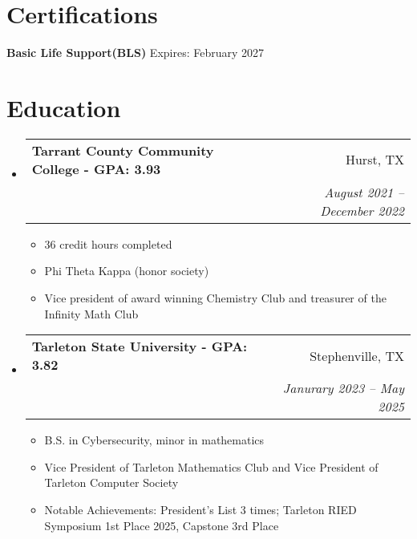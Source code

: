 \documentclass[letterpaper,11pt]{article}
\makeatletter
\newcommand{\resumeItem}[1]{
  \item\small{
    {#1 \vspace{-2pt}}
  }
}
\newcommand{\resumeSubheading}[4]{
  \item
  \begin{tabular*}{0.97\textwidth}[t]{l@{\extracolsep{\fill}}r}
    \textbf{#1} & #2 \\
    \textit{\small#3} & \textit{\small #4} \\
  \end{tabular*}
}
\newcommand{\resumeSubHeadingListStart}{
  \begin{itemize}[leftmargin=0.15in, label={}, topsep=-3pt, itemsep=-3pt]
}
\newcommand{\resumeSubHeadingListEnd}{
  \end{itemize}
}
\newcommand{\resumeItemListStart}{\begin{itemize}}
\newcommand{\resumeItemListEnd}{\end{itemize}\vspace{-5pt}}
\makeatother
\begin{document}
\section{Certifications}
 \begin{itemize}[leftmargin=0.15in, label={}]
    \small{\item{
     \textbf{Basic Life Support(BLS)}{  Expires: February 2027} \\
    }}
 \end{itemize}


\section{Education}
\resumeSubHeadingListStart
    \resumeSubheading
      {Tarrant County Community College \textnormal{- GPA: 3.93}}{Hurst, TX}
      {}{August 2021 -- December 2022}
      \resumeItemListStart
        \resumeItem{36 credit hours completed}
        \resumeItem{Phi Theta Kappa (honor society)}
        \resumeItem{Vice president of award winning Chemistry Club and treasurer of the Infinity Math Club}
      \resumeItemListEnd
  \resumeSubHeadingListEnd
  \resumeSubHeadingListStart
    \vspace{1.0em}
    \resumeSubheading
      {Tarleton State University \textnormal{- GPA: 3.82}}{Stephenville, TX}
      {}{Janurary 2023 -- May 2025}
      \resumeItemListStart
        \resumeItem{B.S. in Cybersecurity, minor in mathematics}
        \resumeItem{Vice President of Tarleton Mathematics Club and Vice President of Tarleton Computer Society}
        \resumeItem{Notable Achievements: President's List 3 times; Tarleton RIED Symposium 1st Place 2025, Capstone 3rd Place}
      \resumeItemListEnd
  \resumeSubHeadingListEnd

\end{document}
